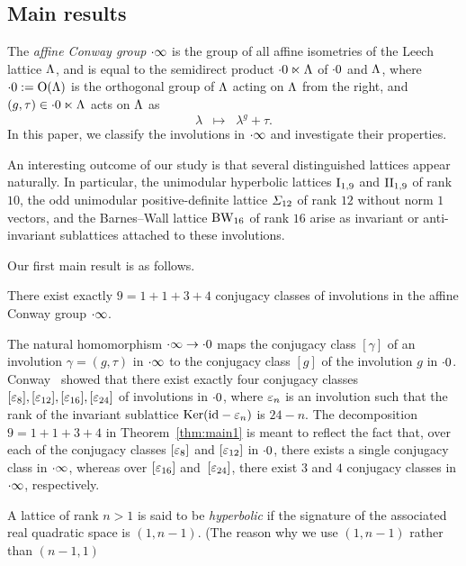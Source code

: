 \documentclass{amsart} %
\begin{document}
\subsection{Main results}
%
The \emph{affine Conway group} $\cdot \infty$ is the group of 
all affine isometries of the Leech lattice $\Lambda$,
and is equal to the semidirect product $\cdot 0 \ltimes \Lambda$
of $\cdot 0$ and $\Lambda$,
where $\cdot 0:=\mathord{\mathrm{O}}(\Lambda)$ is the orthogonal group of $\Lambda$
acting on $\Lambda$ from the right, and 
$(g, \tau)\in \cdot 0 \ltimes \Lambda$ acts on $\Lambda$ as
\[
\lambda\;\;\mapsto\;\; \lambda^g+\tau.
\]
In this paper,
we classify the involutions in $\cdot \infty$ and investigate their properties. 
\par
An interesting outcome of our study is that 
several distinguished lattices appear naturally. 
In particular, the unimodular hyperbolic lattices $\mathrm{I}_{1, 9}$ and $\mathrm{II}_{1, 9}$ of rank $10$, 
the odd unimodular positive-definite lattice $\varSigma_{12}$ 
of rank $12$ without norm $1$ vectors, 
and the Barnes--Wall lattice $\mathrm{BW}_{16}$ of rank $16$ 
arise as invariant or anti-invariant sublattices attached to these involutions.
\par
Our first main result is as follows.
%
%
\begin{theorem}\label{thm:main1}
There exist exactly 
$9=1+1+3+4$
conjugacy classes of involutions in the affine Conway group $\cdot \infty$.
\end{theorem}
%
The natural homomorphism $\cdot \infty \to \cdot 0$ maps
the conjugacy class $[\gamma]$ of an involution $\gamma=(g, \tau)$
in $\cdot \infty$ to the conjugacy class $[g]$ of the involution $g$ in $\cdot 0$. 
Conway~\cite[Chapter 10,~Section 3.7]{theCSbook}
showed that there exist exactly four conjugacy classes
$[\varepsilon_8], [\varepsilon_{12}], [\varepsilon_{16}], [\varepsilon_{24}]$ of involutions in $\cdot 0$,
where $\varepsilon_n$ is an involution such that the rank of 
the invariant sublattice 
$\operatorname{Ker}(\mathord{\mathrm{id}}-\varepsilon_n)$ is $24-n$.
The decomposition $9=1+1+3+4$ in Theorem~\ref{thm:main1} 
is meant to reflect the fact that, over each of the conjugacy classes $[\varepsilon_8]$ and $ [\varepsilon_{12}]$ in $\cdot 0$,
there exists a single conjugacy class in $\cdot \infty$,
whereas over %
$[\varepsilon_{16}]$ and~$ [\varepsilon_{24}]$, %
there exist $3$ and $4$ conjugacy classes
in $\cdot \infty$, respectively.
\par
%
A lattice of rank $n>1$ is said to be \emph{hyperbolic}
if the signature of the associated real quadratic space is $(1, n-1)$.
(The reason why we use $(1, n-1)$ rather than $(n-1, 1)$ 
\end{document}
